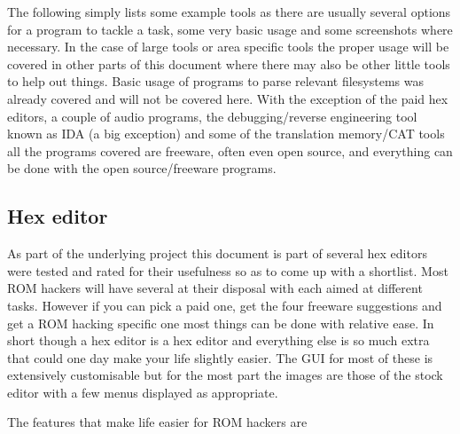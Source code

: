 \documentclass[
]{book}
\begin{document}
The following simply lists some example tools as there are usually several options for a program to tackle a task, some very basic usage and some screenshots where necessary. In the case of large tools or area specific tools the proper usage will be covered in other parts of this document where there may also be other little tools to help out things. Basic usage of programs to parse relevant filesystems was already covered and will not be covered here. With the exception of the paid hex editors, a couple of audio programs, the debugging/reverse engineering tool known as IDA (a big exception) and some of the translation memory/CAT tools all the programs covered are freeware, often even open source, and everything can be done with the open source/freeware programs.

\hypertarget{hex-editor}{%
\subsection{Hex editor}\label{hex-editor}}

As part of the underlying project this document is part of several hex editors were tested and rated for their usefulness so as to come up with a shortlist. Most ROM hackers will have several at their disposal with each aimed at different tasks. However if you can pick a paid one, get the four freeware suggestions and get a ROM hacking specific one most things can be done with relative ease. In short though a hex editor is a hex editor and everything else is so much extra that could one day make your life slightly easier. The GUI for most of these is extensively customisable but for the most part the images are those of the stock editor with a few menus displayed as appropriate.

The features that make life easier for ROM hackers are
\end{document}
